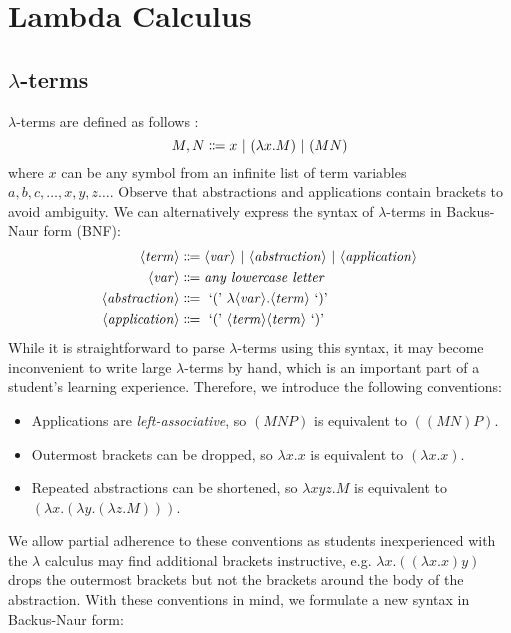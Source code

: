 \section{Lambda Calculus}

\subsection{\texorpdfstring{$\lambda$}{Lambda}-terms}\label{lambda:lambda-terms}
$\lambda$-terms are defined as follows \cite{church:1941}:
\[
    M,N \Coloneqq x \ |\  (\lambda x. M) \ |\  (MN)
\]
where $x$ can be any symbol from an infinite list of term variables $a, b, c, \ldots, x, y, z \ldots$. Observe that abstractions and applications contain brackets to avoid ambiguity. We can alternatively express the syntax of $\lambda$-terms in Backus-Naur form (BNF):
\begin{align*}
    \langle\mathit{term}\rangle &\Coloneqq \langle\mathit{var}\rangle \ |\  \langle\mathit{abstraction}\rangle \ |\  \langle\mathit{application}\rangle \\
    \langle\mathit{var}\rangle &\Coloneqq \textit{any lowercase letter} \\
    \langle\mathit{abstraction}\rangle &\Coloneqq \text{ `(' } \lambda \langle\mathit{var}\rangle. \langle\mathit{term}\rangle \text{ `)' } \\
    \langle\mathit{application}\rangle &\Coloneqq \text{ `(' } \langle\mathit{term}\rangle \langle\mathit{term}\rangle \text{ `)' }
\end{align*}
While it is straightforward to parse $\lambda$-terms using this syntax, it may become inconvenient to write large $\lambda$-terms by hand, which is an important part of a student's learning experience. Therefore, we introduce the following conventions:
\begin{itemize}
    \item Applications are \textit{left-associative}, so $(MNP)$ is equivalent to $((MN)P)$.
    \item Outermost brackets can be dropped, so $\lambda x. x$ is equivalent to $(\lambda x. x)$.
    \item Repeated abstractions can be shortened, so $\lambda xyz. M$ is equivalent to $(\lambda x. (\lambda y. (\lambda z. M)))$.
\end{itemize}
We allow partial adherence to these conventions as students inexperienced with the $\lambda$ calculus may find additional brackets instructive, e.g. $\lambda x. ((\lambda x. x) y)$ drops the outermost brackets but not the brackets around the body of the abstraction. With these conventions in mind, we formulate a new syntax in Backus-Naur form:
